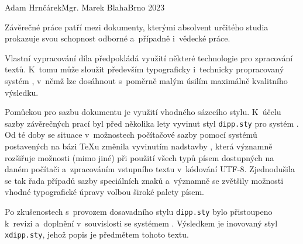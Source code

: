 \documentclass[twoside,12pt]{article}
\begin{document}
{Adam Hrnčárek}{Mgr. Marek Blaha}{Brno 2023}






\obsah
\listoffigures
\listoftables



Závěrečné práce patří mezi dokumenty, kterými absolvent určitého studia
prokazuje svou schopnost odborné a~případně i~vědecké práce.

Vlastní vypracování díla předpokládá využití některé technologie pro
zpracování textů. K~tomu může sloužit především typograficky i~technicky
propracovaný systém \XeLaTeX{}, v~němž lze dosáhnout s~poměrně malým úsilím
maximálně kvalitního výsledku.

Pomůckou pro sazbu dokumentu je využití vhodného sázecího stylu. K~účelu sazby
závěrečných prací byl před několika lety vyvinut styl \texttt{dipp.sty} pro
systém \LaTeXe. Od té doby se situace v~možnostech počítačové sazby pomocí
systémů postavených na bázi \TeX u změnila vyvinutím nadstavby \XeLaTeX, která
významně rozšiřuje možnosti (mimo jiné) při použití všech typů písem dostupných
na daném počítači a~zpracováním vstupního textu v~kódování UTF-8. Zjednodušila
se tak řada případů sazby speciálních znaků a~významně se zvětšily možnosti
vhodné typografické úpravy volbou široké palety písem.

Po zkušenostech s~provozem dosavadního stylu \texttt{dipp.sty} bylo přistoupeno
k~revizi a~doplnění v~souvislosti se systémem \XeLaTeX. Výsledkem je inovovaný
styl \texttt{xdipp.sty}, jehož popis je předmětem tohoto textu.
\end{document}
